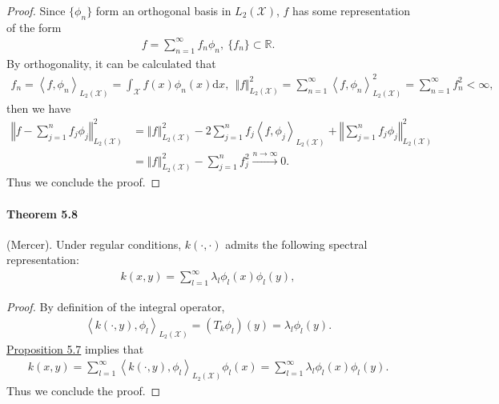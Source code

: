 \documentclass{article}
\begin{document}
\begin{proof}
Since $\lbrace \phi_n\rbrace$ form an orthogonal basis in $L_2(\mathcal{X})$, $f$ has some representation of the form
\begin{align*}
	f=\sum_{n=1}^\infty f_n\phi_n,\ \lbrace f_n\rbrace\subset\mathbb{R}.\tag{5.18}
\end{align*}
By orthogonality, it can be calculated that 
\begin{align*}
	f_n = \left\langle f, \phi_n \right\rangle_{L_2(\mathcal{X})} = \int_\mathcal{X}f(x)\phi_n(x)\mathrm{d}x,\ \ \Vert f \Vert_{L_2(\mathcal{X})}^2 = \sum_{n=1}^\infty \left\langle f, \phi_n \right\rangle_{L_2(\mathcal{X})}^2 = \sum_{n=1}^\infty f_n^2 < \infty,\tag{5.19}
\end{align*}
then we have
\begin{align*}
	\left\Vert f - \sum_{j=1}^n f_j\phi_j \right\Vert_{L_2(\mathcal{X})}^2 &= \left\Vert f\right\Vert_{L_2(\mathcal{X})}^2 - 2\sum_{j=1}^n f_j\left\langle f, \phi_j \right\rangle_{L_2(\mathcal{X})} + \left\Vert \sum_{j=1}^n f_j\phi_j \right\Vert_{L_2(\mathcal{X})}^2 \\
	&= \left\Vert f\right\Vert_{L_2(\mathcal{X})}^2 - \sum_{j=1}^n f_j^2\overset{n\to\infty}{\ \longrightarrow\ } 0.\tag{5.20}
\end{align*}
Thus we conclude the proof.
\end{proof}

\paragraph{Theorem 5.8} (Mercer). Under regular conditions, $k(\cdot,\cdot)$ admits the following spectral representation:
\begin{align*}
	k(x,y) = \sum_{l=1}^\infty \lambda_l\phi_l(x)\phi_l(y),\tag{5.21}
\end{align*}
\begin{proof}
By definition of the integral operator,
\begin{align*}
	\left\langle k(\cdot, y), \phi_l\right\rangle_{L_2(\mathcal{X})} = (T_k\phi_l)(y) = \lambda_l\phi_l(y).\tag{5.22}
\end{align*}
\hyperref[prop:5.7]{Proposition 5.7} implies that
\begin{align*}
	k(x, y) = \sum_{l=1}^\infty \left\langle k(\cdot, y), \phi_l\right\rangle_{L_2(\mathcal{X})}\phi_l(x) = \sum_{l=1}^\infty \lambda_l\phi_l(x)\phi_l(y).\tag{5.23}
\end{align*}
Thus we conclude the proof.
\end{proof} 
\end{document}
